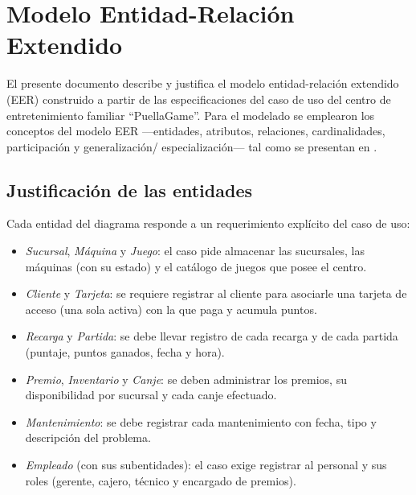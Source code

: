 \documentclass[11pt,letterpaper,spanish]{article}
\begin{document}
\section*{Modelo Entidad-Relación Extendido}

El presente documento describe y justifica el modelo entidad-relación extendido (EER)
construido a partir de las especificaciones del caso de uso del centro de entretenimiento
familiar ``PuellaGame''. Para el modelado se emplearon los conceptos del modelo EER
---entidades, atributos, relaciones, cardinalidades, participación y generalización/
especialización--- tal como se presentan en \parencite{silberschatz2006}.

\subsection*{Justificación de las entidades}

Cada entidad del diagrama responde a un requerimiento explícito del caso de uso:

\begin{itemize}
	\item \emph{Sucursal}, \emph{Máquina} y \emph{Juego}: el caso pide almacenar las
	      sucursales, las máquinas (con su estado) y el catálogo de juegos que posee el
	      centro.
	\item \emph{Cliente} y \emph{Tarjeta}: se requiere registrar al cliente para asociarle
	      una tarjeta de acceso (una sola activa) con la que paga y acumula puntos.
	\item \emph{Recarga} y \emph{Partida}: se debe llevar registro de cada recarga y de cada
	      partida (puntaje, puntos ganados, fecha y hora).
	\item \emph{Premio}, \emph{Inventario} y \emph{Canje}: se deben administrar los premios,
	      su disponibilidad por sucursal y cada canje efectuado.
	\item \emph{Mantenimiento}: se debe registrar cada mantenimiento con fecha, tipo y
	      descripción del problema.
	\item \emph{Empleado} (con sus subentidades): el caso exige registrar al personal y sus
	      roles (gerente, cajero, técnico y encargado de premios).
\end{itemize}
\end{document}
